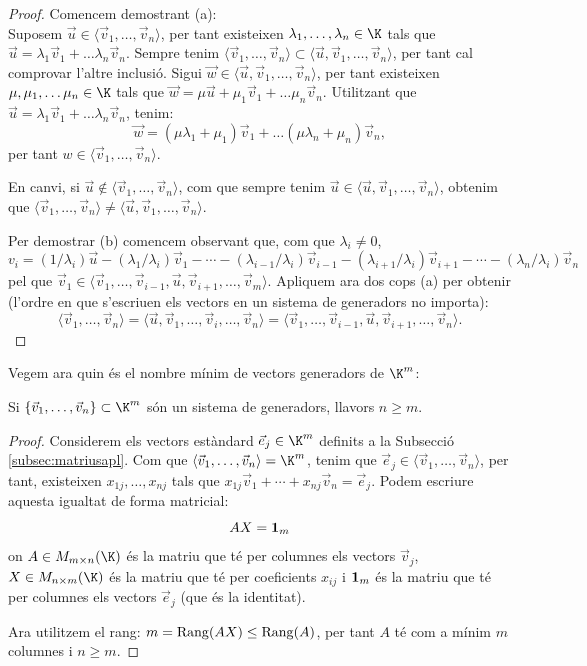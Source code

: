 \begin{proof}
	Comencem demostrant (a):\\
	Suposem $\vec u\in \langle \vec v_1, \dots , \vec v_n \rangle$, per tant existeixen $\lambda_1, \dots, \lambda_n\in\K$ tals que $\vec u=\lambda_1\vec v_1+\dots \lambda_n\vec v_n$. 
	Sempre tenim $\langle \vec v_1, \dots , \vec v_n \rangle\subset\langle\vec u, \vec v_1, \dots , \vec v_n \rangle$, per tant cal comprovar l'altre inclusió. Sigui $\vec w \in \langle\vec u, \vec v_1, \dots , \vec v_n \rangle$, per tant existeixen $\mu,\mu_1,\dots \mu_n\in\K$ tals que $\vec w=\mu \vec u+\mu_1\vec v_1+\dots \mu_n\vec v_n$. Utilitzant que $\vec u=\lambda_1\vec v_1+\dots \lambda_n\vec v_n$, tenim:
	$$
	\vec w=(\mu\lambda_1+\mu_1)\vec v_1+\dots (\mu\lambda_n+\mu_n)\vec v_n ,
	$$
	per tant $w \in \langle \vec v_1, \dots , \vec v_n \rangle$.
	
	En canvi, si $\vec u\notin \langle \vec v_1, \dots , \vec v_n \rangle$, com que sempre tenim $\vec u\in \langle\vec u, \vec v_1, \dots , \vec v_n \rangle$, obtenim que $\langle \vec v_1, \dots , \vec v_n \rangle\neq\langle\vec u, \vec v_1, \dots , \vec v_n \rangle$.
	
	Per demostrar (b) comencem observant que, com que $\lambda_i\neq 0$, 
	$$v_i=(1/\lambda_i) \vec u -(\lambda_1/\lambda_i) \vec v_1- \cdots-(\lambda_{i-1}/\lambda_i) \vec v_{i-1} - (\lambda_{i+1}/\lambda_i) \vec v_{i+1} - \cdots -(\lambda_n/\lambda_i) \vec v_n
	$$
	pel que $\vec v_1 \in \langle \vec v_1, \dots,\vec v_{i-1},\vec u , \vec v_{i+1},\dots,\vec v_m\rangle$. Apliquem ara dos cops (a) per obtenir (l'ordre en que s'escriuen els vectors en un sistema de generadors no importa):
	$$
	\langle \vec v_1, \dots , \vec v_n\rangle=
	\langle \vec u,\vec v_1, \dots, \vec v_i, \dots , \vec v_n\rangle=
	\langle \vec v_1, \dots,\vec v_{i-1},\vec u , \vec v_{i+1},\dots,\vec v_n\rangle.
	$$
\end{proof}
Vegem ara quin és el nombre mínim de vectors generadors de $\K^m$:
\begin{lema}\label{lema:genKn}
    Si $\{\vec v_1, \dots, \vec v_n\}\subset \K^m$ són un sistema de generadors, llavors $n\geq m$.
\end{lema}
\begin{proof}
    Considerem els vectors estàndard $\vec e_j\in\K^m$ definits a la Subsecció \ref{subsec:matriusapl}. Com que $\langle \vec v_1, \dots, \vec v_n \rangle=\K^m$, tenim que $\vec e_j \in \langle \vec v_1, \dots, \vec v_n \rangle$, per tant, existeixen $x_{1j}, \dots, x_{nj}$ tals que $x_{1j} \vec v_1+ \cdots+x_{nj}\vec v_n=\vec e_j$. Podem escriure aquesta igualtat de forma matricial:
    $$
    A X = \mathbf{1}_m
    $$
    on $A \in M_{m\times n}(\K)$ és la matriu que té per columnes els vectors $\vec v_j$, $X\in M_{n\times m}(\K)$ és la matriu que té per coeficients $x_{ij}$ i $\mathbf{1}_m$ és la matriu que té per columnes els vectors $\vec e_j$ (que és la identitat).
    
    Ara utilitzem el rang: $m=\operatorname{Rang}(AX)\leq\operatorname{Rang}(A)$, per tant $A$ té com a mínim $m$ columnes i $n\geq m$.
\end{proof}

